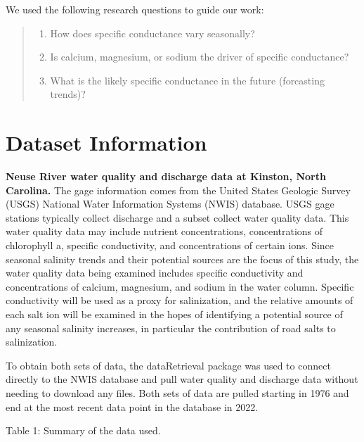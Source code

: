 \documentclass[
  12pt,
]{article}
\providecommand{\tightlist}{%
  \setlength{\itemsep}{0pt}\setlength{\parskip}{0pt}}
\begin{document}
We used the following research questions to guide our work:

\begin{quote}
\begin{enumerate}
\def\labelenumi{\arabic{enumi}.}
\tightlist
\item
  How does specific conductance vary seasonally?
\item
  Is calcium, magnesium, or sodium the driver of specific conductance?
\item
  What is the likely specific conductance in the future (forcasting
  trends)?
\end{enumerate}
\end{quote}

\newpage

\hypertarget{dataset-information}{%
\section{Dataset Information}\label{dataset-information}}

\textbf{Neuse River water quality and discharge data at Kinston, North
Carolina.} The gage information comes from the United States Geologic
Survey (USGS) National Water Information Systems (NWIS) database. USGS
gage stations typically collect discharge and a subset collect water
quality data. This water quality data may include nutrient
concentrations, concentrations of chlorophyll a, specific conductivity,
and concentrations of certain ions. Since seasonal salinity trends and
their potential sources are the focus of this study, the water quality
data being examined includes specific conductivity and concentrations of
calcium, magnesium, and sodium in the water column. Specific
conductivity will be used as a proxy for salinization, and the relative
amounts of each salt ion will be examined in the hopes of identifying a
potential source of any seasonal salinity increases, in particular the
contribution of road salts to salinization.

To obtain both sets of data, the dataRetrieval package was used to
connect directly to the NWIS database and pull water quality and
discharge data without needing to download any files. Both sets of data
are pulled starting in 1976 and end at the most recent data point in the
database in 2022.

Table 1: Summary of the data used.
\end{document}
